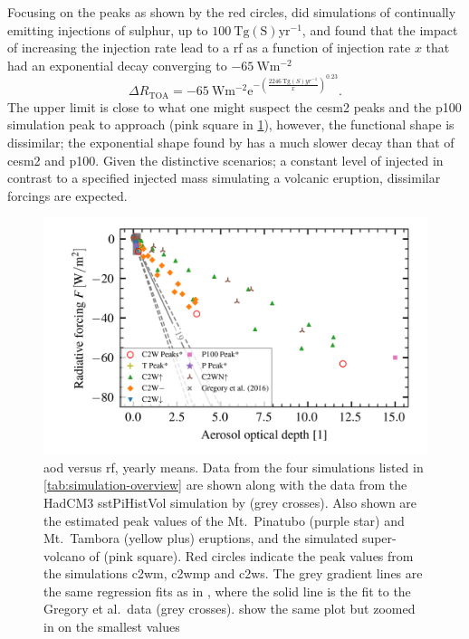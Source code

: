 \documentclass{ametsocV5}
\newcommand{\iso}[1][i]{{#1}njected \ce{SO2}}
\begin{document}
Focusing on the peaks as shown by the red circles, \citet{niemeier2015} did simulations
of continually emitting injections of sulphur, up to \(\SI{100}{\tera\gram
  \mathrm{(S)}\mathrm{yr}^{-1}}\), and found that the impact of increasing the injection
rate lead to a \ac{rf} as a function of injection rate \(x\) that had an exponential
decay converging to \( \SI{-65}{\watt\meter^{-2}} \)
\begin{equation}
  \Delta
  R_{\mathrm{TOA}} =
  -\SI{65}{\watt\metre^{-2}}
  \mathrm{e}^{-{\left(\frac{\SI{2246}{\tera\gram(S)yr^{-1}}}{x}\right)}^{0.23}}.
  \label{eq:niemeier_exponential}
\end{equation}
%
The upper limit is close to what one might suspect the \ac{cesm2} peaks and the
\ac{p100} simulation peak to approach (pink square in \cref{fig:aod_vs_toa_full}),
however, the functional shape is dissimilar; the exponential shape found by
\citet{niemeier2015} has a much slower decay than that of \ac{cesm2} and \ac{p100}.
Given the distinctive scenarios; a constant level of \iso{} in contrast to a specified
injected mass simulating a volcanic eruption, dissimilar forcings are expected.

\begin{figure}[t]
  \begin{center}
    \includegraphics[width=0.95\linewidth]{figures/aod_vs_toa_avg_full.png}
  \end{center}
  \caption{\ac{aod} versus \ac{rf}, yearly means. Data from the four simulations listed
    in \cref{tab:simulation-overview} are shown along with the data from the HadCM3
    sstPiHistVol simulation by \citet{gregory2016} (grey crosses). Also shown are the
    estimated peak values of the Mt.\ Pinatubo (purple star) and Mt.\ Tambora (yellow
    plus) eruptions, and the simulated super-volcano of \citet{jones2005} (pink
    square). Red circles indicate the peak values from the simulations \ac*{c2wm},
    \ac*{c2wmp} and \ac*{c2ws}. The grey gradient lines are the same regression fits as in
    \citet[][Fig.\ 4]{gregory2016}, where the solid line is the fit to the Gregory et al.\
    data (grey crosses).  show the same plot but zoomed in on
    the smallest values}%
  \label{fig:aod_vs_toa_full}
\end{figure}
\end{document}
